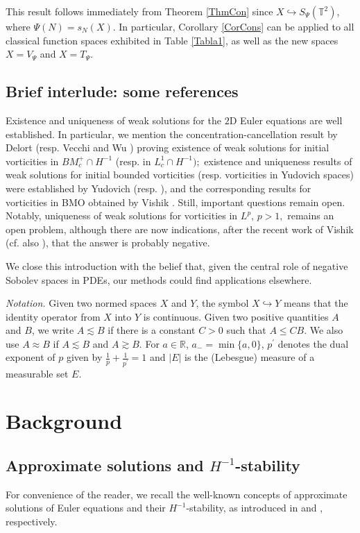 \documentclass[11pt, a4paper,leqno]{amsart}
\theoremstyle{plain}
\numberwithin{equation}{section}
\theoremstyle{definition}
\theoremstyle{remark}
\def\T{\mathbb{T}}
\begin{document}
This result follows immediately from Theorem \ref{ThmCon} since $X \hookrightarrow S_\Psi(\T^2)$, where $\Psi(N) = s_N(X)$. In particular, Corollary \ref{CorCons} can be applied to all classical function spaces  exhibited in Table \ref{Tabla1}, as well as the new spaces $X = V_\Psi$ and $X = T_\Psi$. 

\subsection{Brief interlude: some references\label{sec:approximate}}
Existence and uniqueness of weak solutions for the $2$D Euler equations are well
established. In particular, we mention the concentration-cancellation result by Delort \cite{Delort}
(resp. Vecchi and Wu \cite{Vecc}) proving existence of weak solutions for
initial vorticities in $BM_{c}^{+}\cap H^{-1}$ (resp. in $L_{c}^{1}\cap
H^{-1});$ existence and uniqueness results of weak solutions for initial
bounded vorticities (resp. vorticities in Yudovich spaces) were established by
Yudovich \cite{Y63} (resp. \cite{Y95}), and the corresponding results
for vorticities in BMO obtained by Vishik \cite{V99}.
Still, important questions remain open. Notably, uniqueness of
weak solutions for vorticities in $L^{p}, \, p>1,$ remains an open problem,
although there are now indications, after the recent work of Vishik \cite{V2018}  (cf. also \cite{Adele}), that the answer is probably negative.

We close this introduction with the belief that,
given the central role of negative Sobolev spaces in PDEs, our methods could
find applications elsewhere.

\vspace{4mm}
\emph{Notation.} Given two normed spaces $X$ and $Y$, the symbol $X \hookrightarrow Y$ means that the identity operator  from $X$ into $Y$ is continuous. Given two positive quantities $A$ and $B$, we write $A \lesssim B$ if there is a constant $C > 0$ such that $A \leq C B$.  We also use $A \approx B$ if $A \lesssim B$ and $A \gtrsim B$. For $a\in\mathbb{R}$,  
$a_{-}=\min\{a,0\}$, $p^{\prime}$ denotes the dual
exponent of $p$ given by $\frac{1}{p}+\frac{1}{p^{\prime}}=1$ and $|E|$ is the
(Lebesgue) measure of a measurable set $E$.

\section{Background}


\subsection{Approximate solutions and $H^{-1}$-stability} For convenience of the reader, we  recall the well-known concepts of approximate solutions of Euler equations and their $H^{-1}$-stability, as introduced in \cite{DiPernaMajda} and \cite{LNT}, respectively.  
\end{document}
